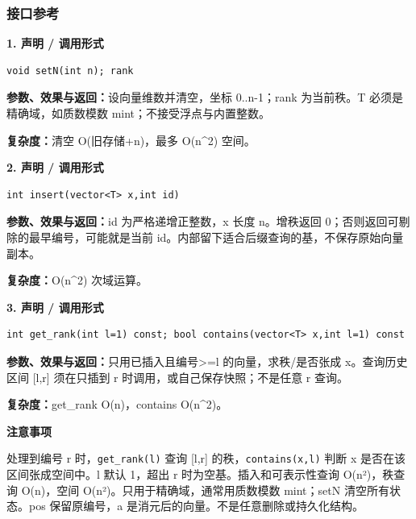 \documentclass[UTF8,a4paper,10pt]{ctexart}
\newcommand{\TemplNote}[1]{\textbf{注意事项}\par #1\par}
\begin{document}
\subsubsection*{接口参考}
\noindent\begin{minipage}{\textwidth}
\textbf{1. 声明 / 调用形式}
\begin{lstlisting}
void setN(int n); rank
\end{lstlisting}
\textbf{参数、效果与返回：}设向量维数并清空，坐标 0..n-1；rank 为当前秩。T 必须是精确域，如质数模数 mint；不接受浮点与内置整数。

\textbf{复杂度：}清空 O(旧存储+n)，最多 O(n\textasciicircum{}2) 空间。

\end{minipage}\par\vspace{0.4em}
\noindent\begin{minipage}{\textwidth}
\textbf{2. 声明 / 调用形式}
\begin{lstlisting}
int insert(vector<T> x,int id)
\end{lstlisting}
\textbf{参数、效果与返回：}id 为严格递增正整数，x 长度 n。增秩返回 0；否则返回可剔除的最早编号，可能就是当前 id。内部留下适合后缀查询的基，不保存原始向量副本。

\textbf{复杂度：}O(n\textasciicircum{}2) 次域运算。

\end{minipage}\par\vspace{0.4em}
\noindent\begin{minipage}{\textwidth}
\textbf{3. 声明 / 调用形式}
\begin{lstlisting}
int get_rank(int l=1) const; bool contains(vector<T> x,int l=1) const
\end{lstlisting}
\textbf{参数、效果与返回：}只用已插入且编号>=l 的向量，求秩/是否张成 x。查询历史区间 [l,r] 须在只插到 r 时调用，或自己保存快照；不是任意 r 查询。

\textbf{复杂度：}get\_rank O(n)，contains O(n\textasciicircum{}2)。

\TemplNote{处理到编号 r 时，\texttt{get\_rank(l)} 查询 [l,r] 的秩，\texttt{contains(x,l)} 判断 x 是否在该区间张成空间中。l 默认 1，超出 r 时为空基。插入和可表示性查询 O(n²)，秩查询 O(n)，空间 O(n²)。只用于精确域，通常用质数模数 mint；setN 清空所有状态。pos 保留原编号，a 是消元后的向量。不是任意删除或持久化结构。}
\end{minipage}\par\vspace{0.4em}
\clearpage
\end{document}
